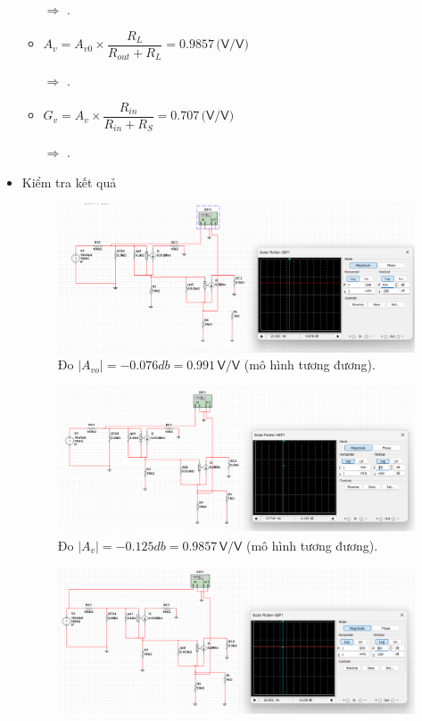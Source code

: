 \begin{itemize}[label=-]
\begin{itemize}[label=+, leftmargin=2cm]
		$\Rightarrow$ .
			
		\item $A_v = A_{v0} \times \dfrac{R_L}{R_{out} + R_L} = 0.9857\,\textsf{(V/V)}$
		
		$\Rightarrow$ .
			
		\item $G_v = A_v \times \dfrac{R_{in}}{R_{in} + R_S} = 0.707\,\textsf{(V/V)}$
		
		$\Rightarrow$ .
	\end{itemize}
	
	\item Kiểm tra kết quả
	
	\begin{figure}[H]
		\centering
		\includegraphics[width=.9\linewidth]{./my-chapters/my-images/Question7/b_avo_tuongduong.png}
		\caption{Đo $|A_{vo}| =-0.076 db = 0.991\,\textsf{V/V}$ (mô hình tương đương).}
	\end{figure}
	\begin{figure}[H]
		\centering
		\includegraphics[width=.9\linewidth]{./my-chapters/my-images/Question7/b_av_tuongduong.png}
		\caption{Đo $|A_{v}| =-0.125 db  = 0.9857\,\textsf{V/V}$ (mô hình tương đương).}
	\end{figure}
	\begin{figure}[H]
		\centering
		\includegraphics[width=.9\linewidth]{./my-chapters/my-images/Question7/b_gv_tuongduong.png}

\end{figure}
\end{itemize}
